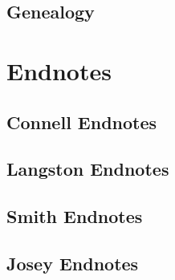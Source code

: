 \documentclass[11pt,letter]{book}
\begin{document}
\section{Genealogy}



\chapter{Endnotes}

\section{Connell Endnotes}

\footnotesize



\normalsize

\section{Langston Endnotes}

\footnotesize



\normalsize

\section{Smith Endnotes}

\footnotesize



\normalsize

\section{Josey Endnotes}

\footnotesize



\normalsize
\end{document}
